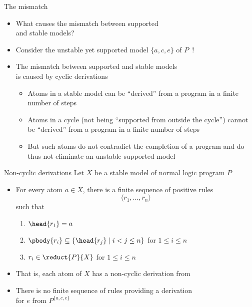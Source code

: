 \begin{frame}{The mismatch}
  \begin{itemize}
  \item<1-> 
    What causes the mismatch between supported\\ and stable models?
      \smallskip
  \item<2-> 
    Consider the unstable yet supported model $\{a,c,e\}$ of $P$~!
    \medskip
  \item<3-> 
    The mismatch between supported and stable models\\ is caused by cyclic derivations
    \begin{itemize}
    \item<4-> Atoms in a stable model can be ``derived'' from a program in a finite number of steps
      \smallskip
    \item<5-> Atoms in a cycle (not being ``supported from outside the cycle'') cannot be ``derived''
      from a program in a finite number of steps
      \smallskip
    \item<6-> []
      But such atoms do not contradict the completion of a program and
      do thus not eliminate an unstable supported model
    \end{itemize}
  \end{itemize}
\end{frame}
\begin{frame}{Non-cyclic derivations}
  \medskip
  Let $X$ be a stable model of normal logic program $P$
  \medskip
  \begin{itemize}
  \item For every atom $a\in X$,
    there is a finite sequence of positive rules
    \[
    \langle r_1,\dots,r_n\rangle
    \]
    such that
    \begin{enumerate}\normalsize
    \item $\head{r_1}=a$
    \item $\pbody{r_i}\subseteq\{\head{r_j} \mid i<j\leq n\}$      \hfill for $1\leq i\leq n\qquad$
    \item $r_i\in\reduct{P}{X}$                                 \hfill for $1\leq i\leq n\qquad$
    \end{enumerate}
    \smallskip
  \item <2-> That is,
    each atom of $X$ has a non-cyclic derivation from 
    \medskip
  \item<3-> 
    There is no finite sequence of rules providing a derivation\\ for $e$ from $P^{\{a,c,e\}}$
  \end{itemize}
\end{frame}
